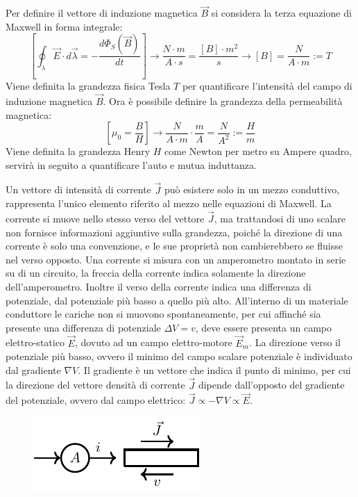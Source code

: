 \documentclass{article}
\numberwithin{equation}{subsection}
\begin{document}
Per definire il vettore di induzione magnetica $\vec{B}$ si considera la terza equazione di Maxwell in forma integrale:
\begin{equation*}
    \displaystyle\left[\oint_{\lambda}\vec{E}\cdot d\vec\lambda=-\frac{d\Phi_S(\vec{B})}{dt}\right]\to\frac{N\cdot m}{A\cdot s}=\frac{[B]\cdot m^2}{s}\to[B]=\frac{N}{A\cdot m}:=T
\end{equation*}
Viene definita la grandezza fisica Tesla $T$ per quantificare l'intensità del campo di induzione magnetica $\vec{B}$. Ora è possibile definire la grandezza della permeabilità 
magnetica:
\begin{equation*}
    \displaystyle\left[\mu_0=\frac{{B}}{{H}}\right]\to\frac{N}{A\cdot m}\cdot\frac{m}{A}=\frac{N}{A^2}:=\frac{H}{m}
\end{equation*}
Viene definita la grandezza Henry $H$ come Newton per metro su Ampere quadro, servirà in seguito a quantificare l'auto e mutua induttanza. 

Un vettore di intensità di corrente $\vec{J}$ può esistere solo in un mezzo conduttivo, rappresenta l'unico elemento riferito al mezzo nelle equazioni di Maxwell. La corrente 
si muove nello stesso verso del vettore $\vec{J}$, ma trattandosi di uno scalare non fornisce informazioni aggiuntive sulla grandezza, poiché la direzione di una corrente è 
solo una convenzione, e le sue proprietà non cambierebbero se fluisse nel verso opposto. Una corrente si misura con un amperometro montato in serie su di un circuito, la freccia 
della corrente indica solamente la direzione dell'amperometro. Inoltre il verso della corrente indica una differenza di potenziale, dal potenziale più basso a quello 
più alto. All'interno di un materiale conduttore le cariche non si muovono spontaneamente, per cui affinché sia presente una differenza di potenziale $\Delta V=v$, deve essere 
presenta un campo elettro-statico $\vec{E}$, dovuto ad un campo elettro-motore $\vec{E}_m$. La direzione verso il potenziale più basso, ovvero il minimo del campo scalare 
potenziale è individuato dal gradiente $\nabla V$. Il gradiente è un vettore che indica il punto di minimo, per cui la direzione del vettore densità di corrente $\vec{J}$ 
dipende dall'opposto del gradiente del potenziale, ovvero dal campo elettrico: $\vec{J}\propto-\nabla V\propto\vec{E}$. 

\begin{figure}[H]%
    \centering
    \includegraphics{amperometro.pdf}
    \label{fig:amperometro}
\end{figure}
\end{document}
